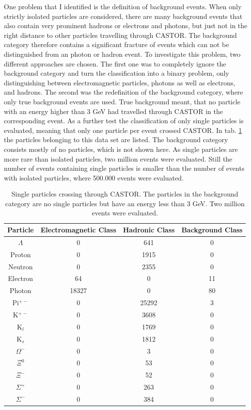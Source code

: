 One problem that I identified is the definition of background events. When only strictly isolated particles are considered, there are many  background events that also contain very prominent hadrons or electrons and photons, but just not in the right distance to other particles travelling through CASTOR. The background category therefore contains a significant fracture of events which can not be distinguished from an photon or hadron event. To investigate this problem, two different approaches are chosen. The first one was to completely ignore the background category and turn the classification into a binary problem, only distinguishing between electromagnetic particles, photons as well as electrons, and hadrons. The second was the redefinition of the background category, where only true background events are used. True background meant, that no particle with an energy higher than 3 GeV had travelled through CASTOR in the corresponding event. As a further test the classification of only single particles is evaluated, meaning that only one particle per event crossed CASTOR. In tab. \ref{singleparticles} the particles belonging to this data set are listed. The background category consists mostly of no particles, which is not shown here. As single particles are more rare than isolated particles, two million events were evaluated. Still the number of events containing single particles is smaller than the number of events with isolated particles, where 500.000 events were evaluated.

\begin{table}
\centering
\caption{Single particles crossing through CASTOR. The particles in the background category are no single particles but have an energy less than 3 GeV. Two million events were evaluated.}
\sffamily
\begin{tabular}{cccc}\hline
Particle & Electromagnetic Class & Hadronic Class & Background Class \\ \hline
$\Lambda$ & 0 & 641 & 0 \\
Proton & 0 & 1915 & 0 \\
Neutron & 0 & 2355 & 0 \\
Electron  & 64 & 0 & 11 \\
Photon & 18327 & 0 & 80 \\
Pi$^{+-}$ & 0 & 25292 & 3 \\ 
K$^{+-}$ & 0 & 3608 & 0 \\
K$_l$ & 0 & 1769 & 0 \\
K$_s$ & 0 & 1812 & 0 \\
$\Omega^-$ & 0 & 3 & 0 \\
$\Xi^0$ & 0 & 53 & 0 \\
$\Xi^-$ & 0 & 52 & 0 \\
$\Sigma^+$ & 0 & 263 & 0 \\
$\Sigma^-$ & 0 & 384 & 0 \\
\hline
\end{tabular}
\label{singleparticles}
\end{table}


